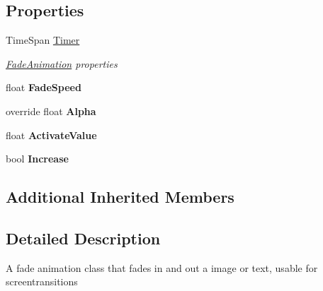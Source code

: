 \subsection*{Properties}
\begin{DoxyCompactItemize}
\item 
Time\-Span \hyperlink{class_pacman_1_1_fade_animation_aa161d233c498500c1abc81b15206a53f}{Timer}
\begin{DoxyCompactList}\small\item\em \hyperlink{class_pacman_1_1_fade_animation}{Fade\-Animation} properties \end{DoxyCompactList}\item 
\hypertarget{class_pacman_1_1_fade_animation_a80295aab2269c152236429d7c210536e}{float {\bfseries Fade\-Speed}}\label{class_pacman_1_1_fade_animation_a80295aab2269c152236429d7c210536e}

\item 
\hypertarget{class_pacman_1_1_fade_animation_a45fb930d0fb229056d7c534c54b8af86}{override float {\bfseries Alpha}}\label{class_pacman_1_1_fade_animation_a45fb930d0fb229056d7c534c54b8af86}

\item 
\hypertarget{class_pacman_1_1_fade_animation_a48ffd9f40659312bd0e0de0c3d87b5eb}{float {\bfseries Activate\-Value}}\label{class_pacman_1_1_fade_animation_a48ffd9f40659312bd0e0de0c3d87b5eb}

\item 
\hypertarget{class_pacman_1_1_fade_animation_a5a828671b9aae1da7d331d995244891f}{bool {\bfseries Increase}}\label{class_pacman_1_1_fade_animation_a5a828671b9aae1da7d331d995244891f}

\end{DoxyCompactItemize}
\subsection*{Additional Inherited Members}


\subsection{Detailed Description}
A fade animation class that fades in and out a image or text, usable for screentransitions 



